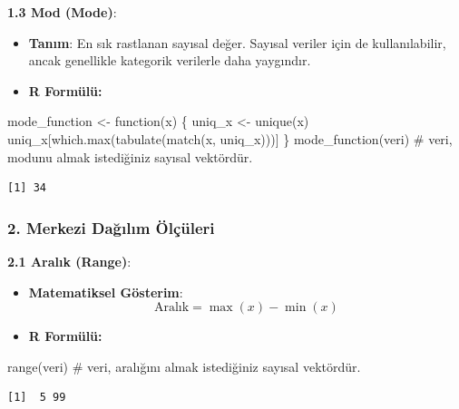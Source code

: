 \documentclass[
  letterpaper,
  DIV=11,
  numbers=noendperiod]{scrartcl}
\newenvironment{Shaded}{\begin{snugshade}}{\end{snugshade}}
\newcommand{\CommentTok}[1]{\textcolor[rgb]{0.37,0.37,0.37}{#1}}
\newcommand{\ControlFlowTok}[1]{\textcolor[rgb]{0.00,0.23,0.31}{#1}}
\newcommand{\FunctionTok}[1]{\textcolor[rgb]{0.28,0.35,0.67}{#1}}
\newcommand{\NormalTok}[1]{\textcolor[rgb]{0.00,0.23,0.31}{#1}}
\newcommand{\OtherTok}[1]{\textcolor[rgb]{0.00,0.23,0.31}{#1}}
\begin{document}
\textbf{1.3 Mod (Mode)}:

\begin{itemize}
\item
  \textbf{Tanım}: En sık rastlanan sayısal değer. Sayısal veriler için
  de kullanılabilir, ancak genellikle kategorik verilerle daha
  yaygındır.
\item
  \textbf{R Formülü:}
\end{itemize}

\begin{Shaded}
\begin{Highlighting}[]
\NormalTok{mode\_function }\OtherTok{\textless{}{-}} \ControlFlowTok{function}\NormalTok{(x) \{}
\NormalTok{  uniq\_x }\OtherTok{\textless{}{-}} \FunctionTok{unique}\NormalTok{(x)}
\NormalTok{  uniq\_x[}\FunctionTok{which.max}\NormalTok{(}\FunctionTok{tabulate}\NormalTok{(}\FunctionTok{match}\NormalTok{(x, uniq\_x)))]}
\NormalTok{\}}
\FunctionTok{mode\_function}\NormalTok{(veri)  }\CommentTok{\# veri, modunu almak istediğiniz sayısal vektördür.}
\end{Highlighting}
\end{Shaded}

\begin{verbatim}
[1] 34
\end{verbatim}

\hypertarget{merkezi-daux11fux131lux131m-uxf6luxe7uxfcleri}{%
\subsubsection{2. Merkezi Dağılım
Ölçüleri}\label{merkezi-daux11fux131lux131m-uxf6luxe7uxfcleri}}

\textbf{2.1 Aralık (Range)}:

\begin{itemize}
\item
  \textbf{Matematiksel Gösterim}: \[\text{Aralık} = \max(x) - \min(x)\]
\item
  \textbf{R Formülü:}
\end{itemize}

\begin{Shaded}
\begin{Highlighting}[]
\FunctionTok{range}\NormalTok{(veri)  }\CommentTok{\# veri, aralığını almak istediğiniz sayısal vektördür.}
\end{Highlighting}
\end{Shaded}

\begin{verbatim}
[1]  5 99
\end{verbatim}
\end{document}
